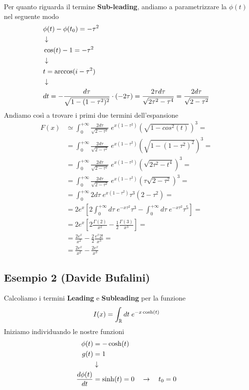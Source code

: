 Per quanto riguarda il termine \textbf{Sub-leading}, andiamo a parametrizzare la $\phi(t)$ nel seguente modo
\begin{align}
	&\phi(t) - \phi(t_0) = -\tau^2 \\ &\downarrow \nonumber \\
	&\cos(t) - 1 = -\tau^2 \nonumber \\ &\downarrow \nonumber \\
	&t= \arccos(i-\tau^2) \\ &\downarrow \nonumber \\
	&dt = -\frac{d\tau}{\sqrt{1-(1-\tau^2)^2}}\cdot(-2\tau) = \frac{2\tau d\tau}{\sqrt{2\tau^2-\tau^4}} = \frac{2d\tau}{\sqrt{2-\tau^2}}
\end{align}
Andiamo così a trovare i primi due termini dell'espansione
\begin{align}
	F(x) &\simeq \int_{0}^{+\infty} \frac{2d\tau}{\sqrt{2-\tau^2}} \; e^{x\left(1- \tau^2\right)}(\sqrt{1-cos^2(t)})^3 = \nonumber\\
	&= \int_{0}^{+\infty} \frac{2d\tau}{\sqrt{2-\tau^2}} \; e^{x\left(1- \tau^2\right)}(\sqrt{1-(1-\tau^2)^2})^3 = \nonumber\\
	&=\int_{0}^{+\infty} \frac{2d\tau}{\sqrt{2-\tau^2}} \; e^{x\left(1- \tau^2\right)}(\sqrt{2\tau^2-t^4})^3 = \nonumber\\
	&=\int_{0}^{+\infty} \frac{2d\tau}{\sqrt{2-\tau^2}} \; e^{x\left(1- \tau^2\right)}(\tau\sqrt{2-\tau^2})^3 = \nonumber\\
	&=\int_{0}^{+\infty} 2d\tau \; e^{x\left(1- \tau^2\right)}\tau^3 (2-\tau^2) = \nonumber\\
	&=2e^x \left[ 2\int_{0}^{+\infty}d\tau \; e^{-x\tau^2} \tau^3 - \int_{0}^{+\infty} d\tau\; e^{-x\tau^2}\tau^5 \right] = \nonumber\\
	&= 2e^x\left[ 2\frac{\Gamma(2)}{x^2} - \frac{1}{2} \frac{\Gamma(3)}{x^3} \right] = \nonumber \\
	&= \frac{2e^x}{x^2} - \frac{2}{2} \frac{e^x 2!}{x^3} =\nonumber\\
	&= \frac{2e^x}{x^2} -\frac{2e^x}{x^3}
\end{align}



\subsection{Esempio 2 (Davide Bufalini)}

Calcoliamo i termini \textbf{Leading} e \textbf{Subleading} per la funzione
\begin{align}
	I(x) = \int_{\mathbb{R}} dt \; e^{-x \cosh(t)}
\end{align}
Iniziamo individuando le  nostre funzioni
\begin{align}
	\phi(t) &= -\cosh(t)\\
	g(t) &= 1 \\ &\downarrow \nonumber \\
	\frac{d\phi(t)}{dt} &= \sinh(t) = 0 \quad \rightarrow \quad t_0 = 0
\end{align}

